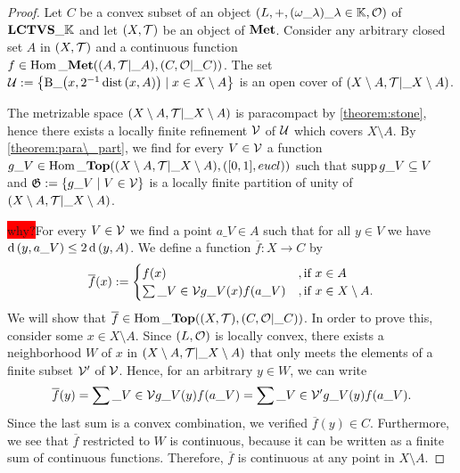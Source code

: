 \begin{proof}
	Let $C$ be a convex subset of an object $\tvspace{\K}$ of $\LCTVS{\K}$ and let $\tspace$ be an object of $\Met$. Consider any arbitrary closed set $A$ in $\tspace$ and a continuous function $f \in \Hom\_\Met\pbraces{\reltspace, \reltspace[C][O]}$. The set $\cover := \Bbraces{\ball[x][2^{-1} \dist\pbraces{x, A}] \mid x \in X \setminus A}$ is an open cover of $\reltspace[X\setminus A][T]$. 
	
	The metrizable space $\reltspace[X \setminus A][T]$ is paracompact by \ref{theorem:stone}, hence there exists a locally finite refinement $\cover[V]$ of $\cover$ which covers $X \setminus A$. By \ref{theorem:para\_part}, we find for every $V \in \cover[V]$ a function $g\_V \in \Hom\_\Top\pbraces{\reltspace[X\setminus A][T], \pbraces{[0,1], \eucl}}$ such that $\supp g\_V \subseteq V$ and $\partition[G] := \Bbraces{g\_V \mid V \in \cover[V]}$ is a locally finite partition of unity of $\reltspace[X \setminus A][T]$.  
	
	\colorbox{red}{why?}For every $V \in \cover[V]$ we find a point $a\_V \in A$ such that for all $y \in V$ we have $\metric\pbraces{y, a\_V} \leq 2 \metric\pbraces{y, A}$. We define a function $\overline{f}: X \to C$ by
	\begin{align*}
		\overline{f}(x) :=
		\begin{cases}
			f(x) &, \text{if } x \in A \\
			\sum\_{V \in \cover[V]} g\_V(x) f\pbraces{a\_V} &, \text{if } x \in X \setminus A.
		\end{cases}
	\end{align*}
	We will show that $\overline{f} \in \Hom\_\Top\pbraces{\tspace, \reltspace[C][O]}$. In order to prove this, consider some $x \in X \setminus A$. Since $\tspace[L][O]$ is locally convex, there exists a neighborhood $W$ of $x$ in $\reltspace[X \setminus A][T]$ that only meets the elements of a finite subset $\cover[V]^\prime$ of $\cover[V]$. Hence, for an arbitrary $y \in W$, we can write
	\begin{align*}
		\overline{f}(y) = \sum\_{V \in \cover[V]} g\_V(y) f\pbraces{a\_V} = \sum\_{V \in \cover[V]^\prime} g\_V(y) f\pbraces{a\_V}.
	\end{align*} 
	Since the last sum is a convex combination, we verified $\overline{f}(y) \in C$. Furthermore, we see that $\overline{f}$ restricted to $W$ is continuous, because it can be written as a finite sum of continuous functions. Therefore, $\overline{f}$ is continuous at any point in $X \setminus A$. 
	

\end{proof}
